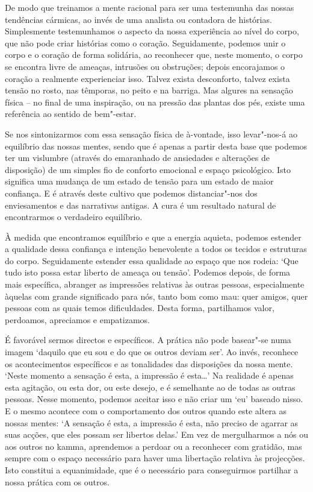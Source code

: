 De modo que treinamos a mente racional para ser uma testemunha das nossas
tendências cármicas, ao invés de uma analista ou contadora de histórias.
Simplesmente testemunhamos o aspecto da nossa experiência ao nível do corpo, que
não pode criar histórias como o coração. Seguidamente, podemos unir o corpo e o
coração de forma solidária, ao reconhecer que, neste momento, o corpo se
encontra livre de ameaças, intrusões ou obstruções; depois encorajamos o coração
a realmente experienciar isso. Talvez exista desconforto, talvez exista tensão
no rosto, nas têmporas, no peito e na barriga. Mas algures na sensação física --
no final de uma inspiração, ou na pressão das plantas dos pés, existe uma
referência ao sentido de bem"-estar.

Se nos sintonizarmos com essa sensação física de à-vontade, isso levar"-nos-á ao
equilíbrio das nossas mentes, sendo que é apenas a partir desta base que podemos
ter um vislumbre (através do emaranhado de ansiedades e alterações de
disposição) de um simples fio de conforto emocional e espaço psicológico. Isto
significa uma mudança de um estado de tensão para um estado de maior confiança.
E é através deste cultivo que podemos distanciar"-nos dos enviesamentos e das
narrativas antigas. A cura é um resultado natural de encontrarmos o verdadeiro
equilíbrio.

À medida que encontramos equilíbrio e que a energia aquieta, podemos estender a
qualidade dessa confiança e intenção benevolente a todos os tecidos e estruturas
do corpo. Seguidamente estender essa qualidade ao espaço que nos rodeia: `Que
tudo isto possa estar liberto de ameaça ou tensão'. Podemos depois, de forma
mais específica, abranger as impressões relativas às outras pessoas,
especialmente àquelas com grande significado para nós, tanto bom como mau: quer
amigos, quer pessoas com as quais temos dificuldades. Desta forma, partilhamos
valor, perdoamos, apreciamos e empatizamos.

É favorável sermos directos e específicos. A prática não pode basear"-se numa
imagem `daquilo que eu sou e do que os outros deviam ser'. Ao invés, reconhece
os acontecimentos específicos e as tonalidades das disposições da nossa mente.
`Neste momento a sensação é esta, a impressão é esta\ldots{}' Na realidade é
apenas esta agitação, ou esta dor, ou este desejo, e é semelhante ao de todas as
outras pessoas. Nesse momento, podemos aceitar isso e não criar um `eu' baseado
nisso. E o mesmo acontece com o comportamento dos outros quando este altera as
nossas mentes: `A sensação é esta, a impressão é esta, não preciso de agarrar as
suas acções, que eles possam ser libertos delas.' Em vez de mergulharmos a nós
ou aos outros no kamma, aprendemos a perdoar ou a reconhecer com gratidão, mas
sempre com o espaço necessário para haver uma libertação relativa às projecções.
Isto constitui a equanimidade, que é o necessário para conseguirmos partilhar a
nossa prática com os outros.

